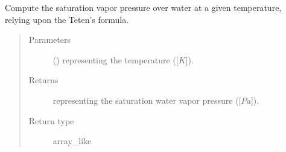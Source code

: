 \documentclass[letterpaper,10pt,english]{sphinxmanual}
\begin{document}
\begin{fulllineitems}
\label{\detokenize{api:utils.utils_meteo.apply_teten_formula}}
Compute the saturation vapor pressure over water at a given temperature, relying upon the Teten’s formula.
\begin{quote}\begin{description}
\item[{Parameters}] \leavevmode
{} () \textendash{}  representing the temperature ({[}\(K\){]}).

\item[{Returns}] \leavevmode
{} representing the saturation water vapor pressure ({[}\(Pa\){]}).

\item[{Return type}] \leavevmode
array\_like

\end{description}\end{quote}

\end{fulllineitems}

\end{document}
